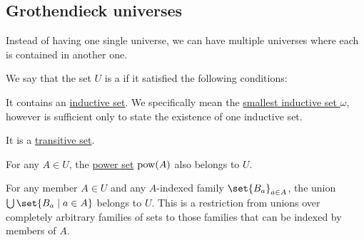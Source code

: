 \subsection{Grothendieck universes}\label{subsec:grothendieck_universes}

Instead of having one single universe, we can have multiple universes where each is contained in another one.

\begin{definition}\label{def:grothendieck_universe}
  We say that the set \( U \) is a  if it satisfied the following conditions:
  \begin{thmenum}
     It contains an \hyperref[def:inductive_set]{inductive set}. We specifically mean the \hyperref[thm:smallest_inductive_set_existence]{smallest inductive set \( \omega \)}, however is sufficient only to state the existence of one inductive set.

     It is a \hyperref[def:transitive_set]{transitive set}.

     For any \( A \in U \), the \hyperref[def:basic_set_operations/power_set]{power set} \( \operatorname{pow}(A) \) also belongs to \( U \).

     For any member \( A \in U \) and any \( A \)-indexed family \( \set{ B_a }_{a \in A} \), the union \( \bigcup\set{ B_a \given a \in A } \) belongs to \( U \). This is a restriction from unions over completely arbitrary families of sets to those families that can be indexed by members of \( A \).
  \end{thmenum}


\end{definition}
